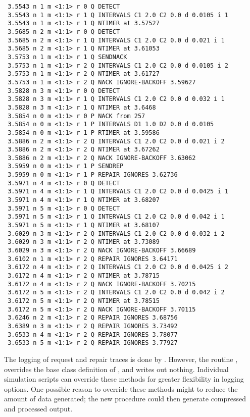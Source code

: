 {\small
\begin{verbatim}
 3.5543 n 1 m <1:1> r 0 Q DETECT
 3.5543 n 1 m <1:1> r 1 Q INTERVALS C1 2.0 C2 0.0 d 0.0105 i 1
 3.5543 n 1 m <1:1> r 1 Q NTIMER at 3.57527
 3.5685 n 2 m <1:1> r 0 Q DETECT
 3.5685 n 2 m <1:1> r 1 Q INTERVALS C1 2.0 C2 0.0 d 0.021 i 1
 3.5685 n 2 m <1:1> r 1 Q NTIMER at 3.61053
 3.5753 n 1 m <1:1> r 1 Q SENDNACK
 3.5753 n 1 m <1:1> r 2 Q INTERVALS C1 2.0 C2 0.0 d 0.0105 i 2
 3.5753 n 1 m <1:1> r 2 Q NTIMER at 3.61727
 3.5753 n 1 m <1:1> r 2 Q NACK IGNORE-BACKOFF 3.59627
 3.5828 n 3 m <1:1> r 0 Q DETECT
 3.5828 n 3 m <1:1> r 1 Q INTERVALS C1 2.0 C2 0.0 d 0.032 i 1
 3.5828 n 3 m <1:1> r 1 Q NTIMER at 3.6468
 3.5854 n 0 m <1:1> r 0 P NACK from 257
 3.5854 n 0 m <1:1> r 1 P INTERVALS D1 1.0 D2 0.0 d 0.0105
 3.5854 n 0 m <1:1> r 1 P RTIMER at 3.59586
 3.5886 n 2 m <1:1> r 2 Q INTERVALS C1 2.0 C2 0.0 d 0.021 i 2
 3.5886 n 2 m <1:1> r 2 Q NTIMER at 3.67262
 3.5886 n 2 m <1:1> r 2 Q NACK IGNORE-BACKOFF 3.63062
 3.5959 n 0 m <1:1> r 1 P SENDREP
 3.5959 n 0 m <1:1> r 1 P REPAIR IGNORES 3.62736
 3.5971 n 4 m <1:1> r 0 Q DETECT
 3.5971 n 4 m <1:1> r 1 Q INTERVALS C1 2.0 C2 0.0 d 0.0425 i 1
 3.5971 n 4 m <1:1> r 1 Q NTIMER at 3.68207
 3.5971 n 5 m <1:1> r 0 Q DETECT
 3.5971 n 5 m <1:1> r 1 Q INTERVALS C1 2.0 C2 0.0 d 0.042 i 1
 3.5971 n 5 m <1:1> r 1 Q NTIMER at 3.68107
 3.6029 n 3 m <1:1> r 2 Q INTERVALS C1 2.0 C2 0.0 d 0.032 i 2
 3.6029 n 3 m <1:1> r 2 Q NTIMER at 3.73089
 3.6029 n 3 m <1:1> r 2 Q NACK IGNORE-BACKOFF 3.66689
 3.6102 n 1 m <1:1> r 2 Q REPAIR IGNORES 3.64171
 3.6172 n 4 m <1:1> r 2 Q INTERVALS C1 2.0 C2 0.0 d 0.0425 i 2
 3.6172 n 4 m <1:1> r 2 Q NTIMER at 3.78715
 3.6172 n 4 m <1:1> r 2 Q NACK IGNORE-BACKOFF 3.70215
 3.6172 n 5 m <1:1> r 2 Q INTERVALS C1 2.0 C2 0.0 d 0.042 i 2
 3.6172 n 5 m <1:1> r 2 Q NTIMER at 3.78515
 3.6172 n 5 m <1:1> r 2 Q NACK IGNORE-BACKOFF 3.70115
 3.6246 n 2 m <1:1> r 2 Q REPAIR IGNORES 3.68756
 3.6389 n 3 m <1:1> r 2 Q REPAIR IGNORES 3.73492
 3.6533 n 4 m <1:1> r 2 Q REPAIR IGNORES 3.78077
 3.6533 n 5 m <1:1> r 2 Q REPAIR IGNORES 3.77927
\end{verbatim}
}
The logging of request and repair traces is done by
.
However, the routine
,
overrides the base class definition of ,
and writes out nothing.
Individual simulation scripts can override these methods
for greater flexibility in logging options.
One possible reason to override these methods might to
reduce the amount of data generated;
the new procedure could then generate compressed and processed output.

